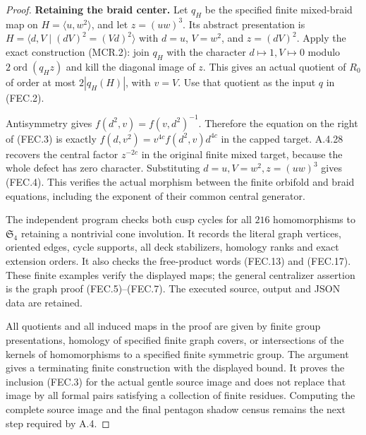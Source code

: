 \begin{proof}
\par\medskip\noindent\textbf{Retaining the braid center.}\quad
Let $q_H$ be the specified finite mixed-braid map
on $H=\langle u,w^2\rangle$, and let $z=(uw)^3$.
Its abstract presentation is
$H=\langle d,V\mid(dV)^2=(Vd)^2\rangle$ with
$d=u$, $V=w^2$, and $z=(dV)^2$.
Apply the exact construction (MCR.2): join $q_H$
with the character $d\mapsto1,V\mapsto0$ modulo
$2\operatorname{ord}(q_Hz)$ and kill the diagonal
image of $z$.  This gives an actual quotient of
$R_0$ of order at most $2|q_H(H)|$, with $v=V$.
Use that quotient as the input $q$ in (FEC.2).

Antisymmetry gives $f(d^2,v)=f(v,d^2)^{-1}$.
Therefore the equation on the right of (FEC.3)
is exactly
$f(d,v^2)=v^{4c}f(d^2,v)d^{4c}$ in the capped
target.  A.4.28 recovers the central factor
$z^{-2c}$ in the original finite mixed target,
because the whole defect has zero character.
Substituting $d=u,V=w^2,z=(uw)^3$ gives (FEC.4).
This verifies the actual morphism between the finite
orbifold and braid equations, including the exponent
of their common central generator.

The independent program
checks both cusp cycles for all $216$ homomorphisms to
$\mathfrak S_4$ retaining a nontrivial cone involution.
It records the literal graph vertices, oriented edges,
cycle supports, all deck stabilizers, homology ranks
and exact extension orders.  It also checks the
free-product words (FEC.13) and (FEC.17).  These finite
examples verify the displayed maps; the general
centralizer assertion is the graph proof (FEC.5)--(FEC.7).
The executed source, output and JSON data are retained.

All quotients and all induced maps in the proof are
given by finite group presentations, homology of
specified finite graph covers, or intersections of
the kernels of homomorphisms to a specified finite
symmetric group.  The argument gives a terminating
finite construction with the displayed bound.
It proves the inclusion (FEC.3) for the actual gentle
source image and does not replace that image by all
formal pairs satisfying a collection of finite
residues.  Computing the complete source image and
the final pentagon shadow census remains the next
step required by A.4.
\end{proof}
